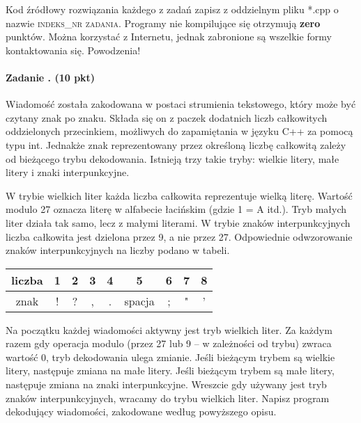 \documentclass[12pt]{article}
\newcounter{zadanie}
\newcommand{\zadanie}{\stepcounter{zadanie}\paragraph*{Zadanie \arabic{zadanie}. (10 pkt)}}
\begin{document}
\small Kod źródłowy rozwiązania każdego z zadań zapisz z oddzielnym pliku *.cpp o nazwie \textsc{indeks}\_\textsc{nr zadania}. Programy nie kompilujące się otrzymują {\bf zero} punktów. Można korzystać z Internetu, jednak zabronione są wszelkie formy kontaktowania się. Powodzenia!

\zadanie
Wiadomość została zakodowana w postaci strumienia tekstowego, który może być czytany znak po znaku. Składa się on z paczek dodatnich liczb całkowitych oddzielonych przecinkiem, możliwych do zapamiętania w języku C++ za pomocą typu \textsf{int}. Jednakże znak reprezentowany przez określoną liczbę całkowitą zależy od bieżącego trybu dekodowania. Istnieją trzy takie tryby: \textsf{wielkie litery}, \textsf{małe litery} i \textsf{znaki interpunkcyjne}. 

\vspace{0.2cm}
W trybie \textsf{wielkich liter} każda liczba całkowita reprezentuje wielką literę. Wartość modulo 27 oznacza literę w alfabecie łacińskim (gdzie 1 = A itd.).
Tryb \textsf{małych liter} działa tak samo, lecz z małymi literami.
W trybie \textsf{znaków interpunkcyjnych} liczba całkowita jest dzielona przez 9, a nie przez 27. Odpowiednie odwzorowanie znaków interpunkcyjnych na liczby podano w tabeli.

\begin{table}[h]
 \centering
 \begin{tabular}{|c||c|c|c|c|c|c|c|c|}
  \hline
  liczba & 1 & 2 & 3 & 4 & 5 & 6 & 7 & 8 \\ \hline
  znak & ! & ? & , & . & spacja & ; & " & ' \\ \hline
 \end{tabular}
\end{table}

Na początku każdej wiadomości aktywny jest tryb wielkich liter. Za każdym razem gdy operacja modulo (przez 27 lub 9 -- w zależności od trybu) zwraca wartość 0, tryb dekodowania ulega zmianie. Jeśli bieżącym trybem są wielkie litery, następuje zmiana na małe litery. Jeśli bieżącym trybem są małe litery, następuje zmiana na znaki interpunkcyjne. Wreszcie gdy używany jest tryb znaków interpunkcyjnych, wracamy do trybu wielkich liter. Napisz program dekodujący wiadomości, zakodowane według powyższego opisu.
\end{document}
